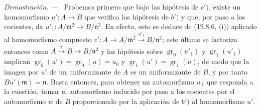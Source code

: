 \documentclass[10pt,oneside]{book}
\newcommand{\oldpage}[2][]{%
  \setcounter{footnote}{0}%
  \marginpar{\scriptsize\textbf{#1}~|~#2}\ignorespaces}
\newenvironment{proof}{%
  \par\medskip\noindent\textit{Demostración. ---\ }}{\par}
\begin{document}
\begin{proof}
Probemos primero que bajo las hipótesis de $c')$, existe un homomorfismo
$u':A\to B$ que verifica las hipótesis de $b')$ y que, por paso a los cocientes,
da $u'_1:A/\mathfrak m^2\to B/\mathfrak n^2$. En efecto, esto se deduce de
(19.8.6, (i)) aplicado al homomorfismo compuesto
$v':A\to A/\mathfrak m^2\xrightarrow{u'_1}B/\mathfrak n^2$;
\oldpage[0\textsubscript{IV-1}]{166}
este último se factoriza entonces como $A\xrightarrow{u'}B\to B/\mathfrak n^2$
y las hipótesis sobre $\operatorname{gr}_0(u'_1)$ y
$\operatorname{gr}_1(u'_1)$ implican
$\operatorname{gr}_0(u')=\operatorname{gr}_0(u)=u_0$ y
$\operatorname{gr}_1(u')=\operatorname{gr}_1(u)$, de modo que la imagen por
$u'$ de un uniformizante de $A$ es un uniformizante de $B$, y por tanto
$Bu'(\mathfrak m)=\mathfrak n$. Basta entonces, para obtener un automorfismo
$w_1$ que responda a la cuestión, tomar el automorfismo inducido por paso a los
cocientes por el automorfismo $w$ de $B$ proporcionado por la aplicación de
$b')$ al homomorfismo $u'$.
\end{proof}
\end{document}

